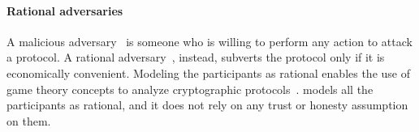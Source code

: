 \smallskip

\paragraph*{Rational adversaries}

A malicious adversary~\cite{Hazay10anote} is someone who is willing to perform any action to attack a protocol. A rational adversary~\cite{Groce2012}, instead, subverts the protocol only if it is economically convenient.
Modeling the participants as rational enables the use of game theory concepts to analyze cryptographic protocols~\cite{Asharov2016,raap,Provi07summaryreport}.
%
\shortname models all the participants as rational, and it does not rely on any trust or honesty assumption on them.

